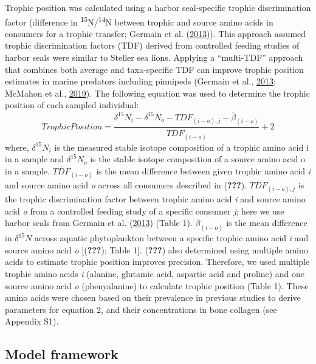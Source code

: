 \documentclass [11pt, proquest] {uwthesis}[2015/03/03]
\begin{document}
Trophic position was calculated using a harbor seal-specific trophic
discrimination factor (difference in
\textsuperscript{15}N/\textsuperscript{14}N between trophic and source
amino acids in consumers for a trophic transfer; Germain et al.
(\protect\hyperlink{ref-Germain2013}{2013})). This approach assumed
trophic discrimination factors (TDF) derived from controlled feeding
studies of harbor seals were similar to Steller sea lions. Applying a
``multi-TDF'' approach that combines both average and taxa-specific TDF
can improve trophic position estimates in marine predators including
pinnipeds (Germain et al., \protect\hyperlink{ref-Germain2013}{2013};
McMahon et al., \protect\hyperlink{ref-McMahon2019}{2019}). The
following equation was used to determine the trophic position of each
sampled individual:
\begin{equation} 
Trophic Position =   
  \frac{\delta^{15}N_i - \delta^{15}N_o - TDF_{(i-o),j} - \overline{\beta}_{(i-o)}}{\overline{TDF}_{(i-o)}}+2
  \label{eq:TP}
\end{equation}
where, \(\delta^{15}N_i\) is the measured stable isotope composition of
a trophic amino acid i in a sample and \(\delta^{15}N_o\) is the stable
isotope composition of a source amino acid o in a sample.
\(\overline{TDF}_{(i-o)}\) is the mean difference between given trophic
amino acid \emph{i} and source amino acid \emph{o} across all consumers
described in ({\textbf{???}}). \(TDF_{(i-o), j}\) is the trophic
discrimination factor between trophic amino acid \emph{i} and source
amino acid \emph{o} from a controlled feeding study of a specific
consumer \emph{j}; here we use harbor seals from Germain et al.
(\protect\hyperlink{ref-Germain2013}{2013}) (Table 1).
\(\overline\beta_{(i-o)}\) is the mean difference in \(\delta^{15}N\)
across aquatic phytoplankton between a specific trophic amino acid
\emph{i} and source amino acid \emph{o} {[}({\textbf{???}}); Table 1{]}.
({\textbf{???}}) also determined using multiple amino acids to estimate
trophic position improves precision. Therefore, we used multiple trophic
amino acids \emph{i} (alanine, glutamic acid, aspartic acid and proline)
and one source amino acid \emph{o} (phenyalanine) to calculate trophic
position (Table 1). These amino acids were chosen based on their
prevalence in previous studies to derive parameters for equation 2, and
their concentrations in bone collagen (see Appendix S1).

\subsection{Model framework}\label{model-framework}
\end{document}
